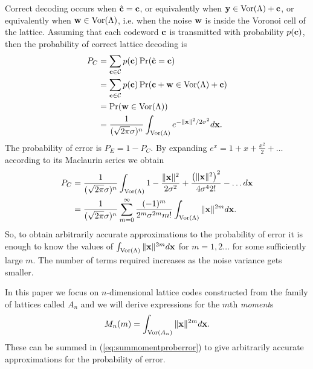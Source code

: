 \documentclass[journal]{IEEEtran}
\begin{document}
Correct decoding occurs when $\hat{\mathbf{c}} = \mathbf{c}$, or equivalently when $\mathbf{y} \in \operatorname{Vor}(\Lambda) + \mathbf{c}$, or equivalently when $\mathbf{w} \in \operatorname{Vor}(\Lambda)$, i.e. when the noise $\mathbf{w}$ is inside the Voronoi cell of the lattice.  Assuming that each codeword $\mathbf{c}$ is transmitted with probability $p(\mathbf{c})$, then the probability of correct lattice decoding is
\begin{align}
P_C &= \sum_{\cbf \in \calC} p(\cbf) \prob( \hat{\cbf} = \cbf ) \\
&= \sum_{\cbf\in \calC} p(\cbf) \prob( \cbf + \wbf \in \vor(\Lambda) + \cbf )  \nonumber \\
&= \prob(\wbf \in \vor(\Lambda) ) \nonumber \\
&=   \frac{1}{(\sqrt{2\pi}\sigma)^n} \int_{\vor(\Lambda)}e^{-\|\xbf\|^2 / 2\sigma^2 } d\xbf. \label{eq:PEgaussian}
\end{align}
The probability of error is $P_E = 1 - P_C$.  By expanding $e^x = 1  + x + \frac{x^2}{2} + \dots$ according to its Maclaurin series we obtain
\begin{align}
P_C  &= \frac{1}{(\sqrt{2\pi}\sigma)^n}\int_{\vor(\Lambda)} 1
- \frac{\|\xbf\|^2}{2\sigma^2} + \frac{\left(\|\xbf\|^2\right)^2}{
4\sigma^42!} - \dots d\xbf \nonumber \\
&= \frac{1}{(\sqrt{2\pi}\sigma)^n} \sum_{m=0}^\infty
\frac{(-1)^m}{2^m\sigma^{2m}m!} \int_{\vor(\Lambda)} \|\xbf\|^{2m}
d\xbf.  \label{eq:summomentproberror}
\end{align}
So, to obtain arbitrarily accurate approximations to the probability of error it is enough to know the values of $\int_{\operatorname{Vor}(\Lambda)} \|\mathbf{x}\|^{2m} d\mathbf{x}$ for $m=1,2\dots$ for some sufficiently large $m$.  The number of terms required increases as the noise variance gets smaller.  %

\newcommand{\calM}{M}
In this paper we focus on $n$-dimensional lattice codes constructed from the family of lattices called $A_n$ and  we will derive expressions for the $m$th \emph{moment}s
\[
 \calM_n(m) = \int_{\vor(A_n)} \|\xbf\|^{2m} d\xbf.
\]
These can be summed in (\ref{eq:summomentproberror}) to give arbitrarily accurate approximations for the probability of error.
\end{document}
